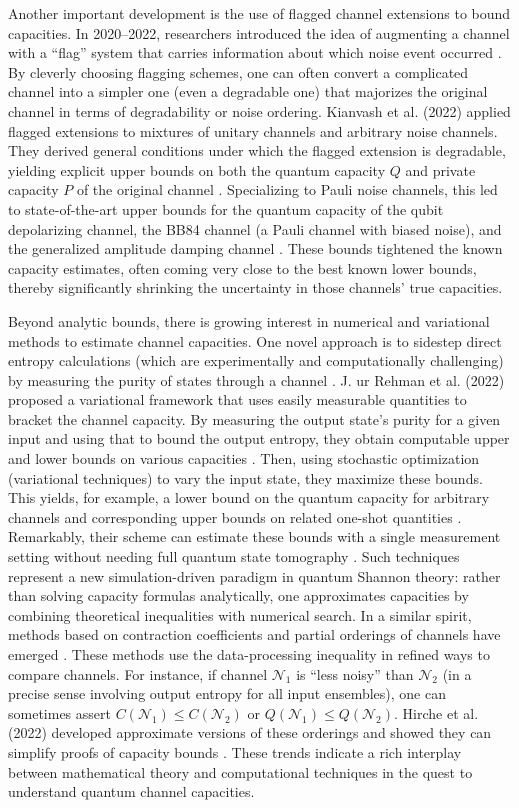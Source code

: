 \documentclass[11pt]{article}
\theoremstyle{plain}
\theoremstyle{definition}
\numberwithin{equation}{section}
\begin{document}
Another important development is the use of flagged channel extensions to bound capacities. In 2020–2022, researchers introduced the idea of augmenting a channel with a “flag” system that carries information about which noise event occurred \cite{22}. By cleverly choosing flagging schemes, one can often convert a complicated channel into a simpler one (even a degradable one) that majorizes the original channel in terms of degradability or noise ordering. Kianvash et al. (2022) applied flagged extensions to mixtures of unitary channels and arbitrary noise channels. They derived general conditions under which the flagged extension is degradable, yielding explicit upper bounds on both the quantum capacity $Q$ and private capacity $P$ of the original channel \cite{22}. Specializing to Pauli noise channels, this led to state-of-the-art upper bounds for the quantum capacity of the qubit depolarizing channel, the BB84 channel (a Pauli channel with biased noise), and the generalized amplitude damping channel \cite{22}. These bounds tightened the known capacity estimates, often coming very close to the best known lower bounds, thereby significantly shrinking the uncertainty in those channels’ true capacities.


Beyond analytic bounds, there is growing interest in numerical and variational methods to estimate channel capacities. One novel approach is to sidestep direct entropy calculations (which are experimentally and computationally challenging) by measuring the purity of states through a channel \cite{66}. J. ur Rehman et al. (2022) proposed a variational framework that uses easily measurable quantities to bracket the channel capacity. By measuring the output state’s purity for a given input and using that to bound the output entropy, they obtain computable upper and lower bounds on various capacities \cite{66}. Then, using stochastic optimization (variational techniques) to vary the input state, they maximize these bounds. This yields, for example, a lower bound on the quantum capacity for arbitrary channels and corresponding upper bounds on related one-shot quantities \cite{66}. Remarkably, their scheme can estimate these bounds with a single measurement setting without needing full quantum state tomography \cite{10}. Such techniques represent a new simulation-driven paradigm in quantum Shannon theory: rather than solving capacity formulas analytically, one approximates capacities by combining theoretical inequalities with numerical search. In a similar spirit, methods based on contraction coefficients and partial orderings of channels have emerged \cite{77}. These methods use the data-processing inequality in refined ways to compare channels. For instance, if channel $\mathcal{N}_1$ is “less noisy” than $\mathcal{N}_2$ (in a precise sense involving output entropy for all input ensembles), one can sometimes assert $C(\mathcal{N}_1)\le C(\mathcal{N}_2)$ or $Q(\mathcal{N}_1)\le Q(\mathcal{N}_2)$. Hirche et al. (2022) developed approximate versions of these orderings and showed they can simplify proofs of capacity bounds \cite{77}. These trends indicate a rich interplay between mathematical theory and computational techniques in the quest to understand quantum channel capacities.
\end{document}
